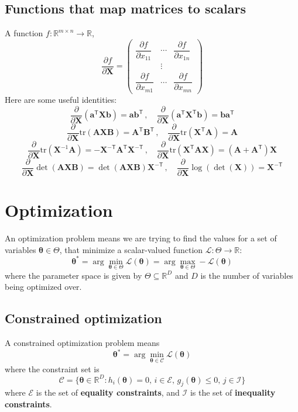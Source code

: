 \documentclass[11pt]{article}
\begin{document}
\subsection{Functions that map matrices to scalars}
A function $f: \mathbb{R}^{m \times n} \to \mathbb{R}$,
\[
\frac{\partial f}{\partial \mathbf{X}} = \begin{pmatrix} \dfrac{\partial f}{\partial x_{11}} & \cdots & \dfrac{\partial f}{\partial x_{1n}} \\ & \vdots & \\ \dfrac{\partial f}{\partial x_{m1}} & \cdots & \dfrac{\partial f}{\partial x_{mn}} \end{pmatrix}
\]
Here are some useful identities:
\[
\frac{\partial}{\partial \mathbf{X}} (\boldsymbol{a}^\mathsf{T} \mathbf{X} \boldsymbol{b}) = \boldsymbol{a} \boldsymbol{b}^\mathsf{T}
\, , \quad
\frac{\partial}{\partial \mathbf{X}} (\boldsymbol{a}^\mathsf{T} \mathbf{X}^\mathsf{T} \boldsymbol{b}) = \boldsymbol{b} \boldsymbol{a}^\mathsf{T}
\]
\[
\frac{\partial}{\partial \mathbf{X}} \text{tr}(\mathbf{A} \mathbf{X} \mathbf{B}) = \mathbf{A}^\mathsf{T} \mathbf{B}^\mathsf{T}
\, , \quad
\frac{\partial}{\partial \mathbf{X}} \text{tr}(\mathbf{X}^\mathsf{T} \mathbf{A}) = \mathbf{A}
\]
\[
\frac{\partial}{\partial \mathbf{X}} \text{tr}(\mathbf{X}^{-1} \mathbf{A}) = -\mathbf{X}^{-\mathsf{T}} \mathbf{A}^\mathsf{T} \mathbf{X}^{-\mathsf{T}}
\, , \quad
\frac{\partial}{\partial \mathbf{X}} \text{tr}(\mathbf{X}^\mathsf{T} \mathbf{A} \mathbf{X}) = (\mathbf{A} + \mathbf{A}^\mathsf{T}) \mathbf{X}
\]
\[
\frac{\partial}{\partial \mathbf{X}} \det(\mathbf{A} \mathbf{X} \mathbf{B}) = \det(\mathbf{A} \mathbf{X} \mathbf{B}) \mathbf{X}^{-\mathsf{T}}
\, , \quad
\frac{\partial}{\partial \mathbf{X}} \log(\det(\mathbf{X})) = \mathbf{X}^{-\mathsf{T}}
\]

\clearpage
\section{Optimization}
An optimization problem means we are trying to find the values for a set of variables $\boldsymbol{\theta} \in \Theta$, that minimize a scalar-valued function $\mathcal{L}: \Theta \to \mathbb{R}$:
\[
\boldsymbol{\theta}^* = \arg\min_{\boldsymbol{\theta} \in \Theta} \mathcal{L}(\boldsymbol{\theta}) = \arg\max_{\boldsymbol{\theta} \in \Theta} -\mathcal{L}(\boldsymbol{\theta})
\]
where the parameter space is given by $\Theta \subseteq \mathbb{R}^D$ and $D$ is the number of variables being optimized over.

\subsection{Constrained optimization}
A constrained optimization problem means
\[
\boldsymbol{\theta}^* = \arg\min_{\boldsymbol{\theta} \in \mathcal{C}} \mathcal{L}(\boldsymbol{\theta})
\]
where the constraint set is
\[
\mathcal{C} = \{\boldsymbol{\theta} \in \mathbb{R}^D : h_i(\boldsymbol{\theta}) = 0,\, i \in \mathcal{E},\, g_j(\boldsymbol{\theta}) \leq 0,\, j \in \mathcal{I}\}
\]
where $\mathcal{E}$ is the set of \textbf{equality constraints}, and $\mathcal{I}$ is the set of \textbf{inequality constraints}.
\end{document}
